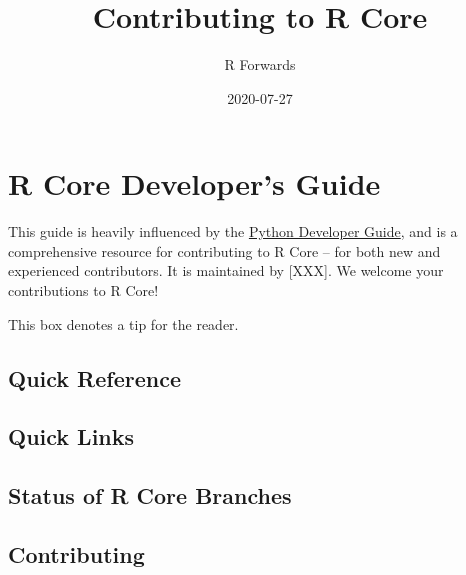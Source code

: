 \documentclass[]{book}
\title{Contributing to R Core}
\author{R Forwards}
\date{2020-07-27}
\begin{document}
\maketitle

{
\setcounter{tocdepth}{1}
\tableofcontents
}
\hypertarget{section}{%
\chapter*{}\label{section}}

\hypertarget{r-core-developers-guide}{%
\chapter{R Core Developer's Guide}\label{r-core-developers-guide}}

This guide is heavily influenced by the \href{https://devguide.python.org/appendix/\#basics-for-contributors}{Python Developer Guide}, and is a comprehensive resource for contributing to R Core -- for both new and experienced contributors. It is maintained by {[}XXX{]}. We welcome your contributions to R Core!

\begin{note}

This box denotes a tip for the reader.

\end{note}

\hypertarget{quick-reference}{%
\section{Quick Reference}\label{quick-reference}}

\hypertarget{quick-links}{%
\section{Quick Links}\label{quick-links}}

\hypertarget{status-of-r-core-branches}{%
\section{Status of R Core Branches}\label{status-of-r-core-branches}}

\hypertarget{contributing}{%
\section{Contributing}\label{contributing}}
\end{document}
